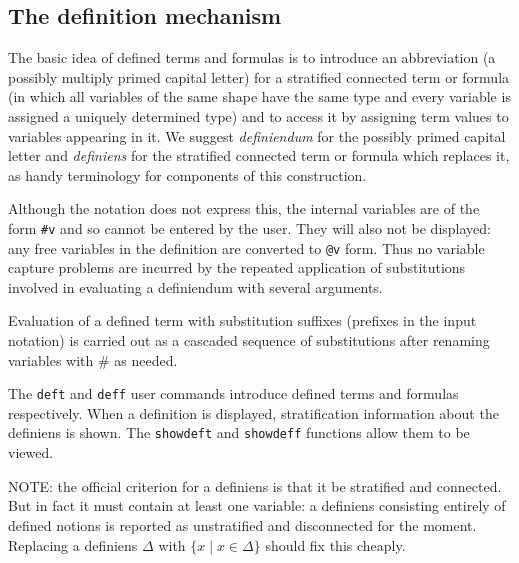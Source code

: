 \documentclass{article}
\begin{document}
\subsection{The definition mechanism}

The basic idea of defined terms and formulas is to introduce an abbreviation (a possibly multiply primed capital letter)
for a stratified connected term or formula (in which all variables of the same shape have the same type and every variable is assigned a uniquely determined type) and to access it by assigning term values to variables appearing in it.  We suggest {\em definiendum\/} for the possibly primed capital letter and {\em definiens\/} for the stratified connected term or formula which replaces it, as handy terminology for components of this construction.

Although the notation does not express this, the internal variables are of the form {\tt \#v} and so cannot be
entered by the user.  They will also not be displayed:  any free variables in the definition are converted to {\tt @v} form.  Thus no variable capture problems are incurred by the repeated application of substitutions involved in evaluating a definiendum with several arguments.

Evaluation of a defined term with substitution suffixes (prefixes in the input notation) is carried out as a cascaded sequence of substitutions after renaming variables with \# as needed.

The {\tt deft} and {\tt deff} user commands introduce defined terms and formulas respectively.  When a definition is displayed, stratification information about the definiens is shown.  The {\tt showdeft}
and {\tt showdeff} functions allow them to be viewed.

NOTE:  the official criterion for a definiens is that it be stratified and connected.  But in fact it must contain at least one variable:  a definiens consisting entirely of defined notions is reported as unstratified and disconnected for the moment.
Replacing a definiens $\Delta$ with $\{x\mid x \in \Delta\}$ should fix this cheaply.
\end{document}
